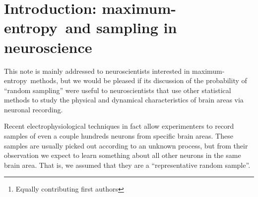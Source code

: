 \documentclass{article}
\title{\pdftitle}
\author{
  P.G.L. Porta Mana\thanks{Equally contributing first authors}\\Independent researcher\\\texttt{pgl@portamana.org}
  \And
  V. Rostami$^*$\\Forschungszentrum J{\"u}lich INM-6\\Germany\\\texttt{v.rostami@fz-juelich.de}
  \And
E. Torre\\Moneylaunderingland  
}
\theoremstyle{remark}
\theoremstyle{innote}
\newcommand*{\citep}{\parencites}
\renewcommand*{\cite}{\citep}
\renewcommand*{\|}{\mathpunct{|}}%
\theoremstyle{simple}
\newcommand*{\me}{maximum-entropy}
\begin{document}

\maketitle

\begin{abstract}
  This note has three nested purposes. The first purpose is to show that
  the \me\ method can be applied to a representative random sample of a
  population, to generate its probability distribution, along two different
  routes. Both routes appear legitimate, but they give inequivalent
  results. Which route should be chosen? Some arguments are presented in
  favour of one. The second more general purpose, motivated by the above
  dilemma, is to remind readers that models like \me\ may contain hidden
  assumptions; in this case the hidden an unnatural assumption that the
  sample modelled is isolated from the rest of the population. The third
  purpose is to promote some old but possibly forgotten probability
  formulae that may be useful in neuroscientific sampling contexts.
\end{abstract}

\section{Introduction: \me\ and sampling in neuroscience}

This note is mainly addressed to neuroscientists interested in \me\
methods, but we would be pleased if its discussion of the probability of
\enquote{random sampling} were useful to neuroscientists that use other
statistical methods to study the physical and dynamical characteristics of
brain areas via neuronal recording.

Recent electrophysiological techniques \cite{***} in fact allow
experimenters to record samples of even a couple hundreds neurons from
specific brain areas. These samples are usually picked out according to an
unknown process, but from their observation we expect to learn something
about all other neurons in the same brain area. That is, we assumed
that they are a \enquote{representative random sample}.
\end{document}
